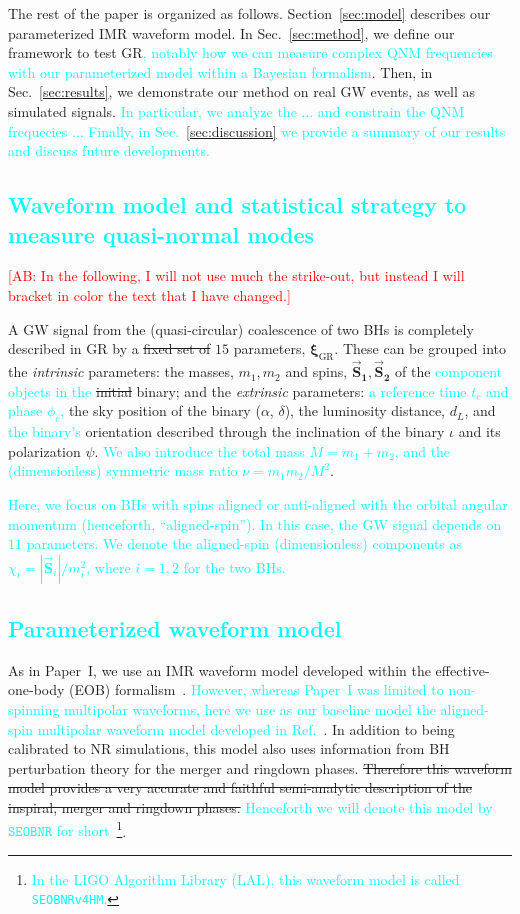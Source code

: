 \documentclass[twocolumn,prd,aps,superscriptaddress,preprintnumbers,tightenlines,showpacs,nofootinbib,eqsecnum,amsfonts,amsmath]{revtex4-1}
\newcommand{\paperone}{Paper~I\xspace}
\newcommand{\ab}[1]{\textcolor{cyan}{#1}}
\newcommand{\comment}[1]{\textcolor{red}{[#1]}}
\newcommand{\bxigr}{\bm{\xi}_{\text{GR}}}
\newcommand{\bs}[1]{\bm{\vec{S}_{#1}}}
\newcommand{\SEOB}{\texttt{SEOBNR}}
\begin{document}
The rest of the paper is organized as follows. Section~\ref{sec:model} describes our parameterized IMR
waveform model. In Sec.~\ref{sec:method}, we define our framework to test GR\ab{, notably how we can measure 
complex QNM frequencies with our parameterized model within a Bayesian formalism}. Then, in Sec.~\ref{sec:results}, 
we demonstrate our method on real GW events, as well as simulated signals. \ab{In particular, we analyze 
the ... and constrain the QNM frequecies ... Finally, in Sec.~\ref{sec:discussion} we provide a summary of
our results and discuss future developments.} 

\ab{\section{Waveform model and statistical strategy to measure quasi-normal modes}}

\comment{AB: In the following, I will not use much the strike-out, but instead I will 
bracket in color the text that I have changed.}

A GW signal from the (quasi-circular) coalescence of two BHs is
completely described in GR by a \sout{fixed set of} $15$ parameters,
$\bxigr$. These can be grouped into the \emph{intrinsic} parameters:
the masses, $m_1, m_2$ and spins, $\bs1, \bs2$ of the \ab{component 
objects in the} \sout{initial} binary; and the 
\emph{extrinsic} parameters: \ab{a reference time $t_c$ and phase 
$\phi_c$,} the sky position of the binary ($\alpha$,
$\delta$), the luminosity distance, $d_L$, and \ab{the binary's} orientation
described through the inclination of the binary $\iota$ and its
polarization $\psi$. \ab{We also introduce the total mass $M = m_1+m_2$, 
and the (dimensionless) symmetric mass ratio $\nu = m_1m_2/M^2$}. 

\ab{Here, we focus on BHs with spins aligned or anti-aligned 
with the orbital angular momentum (henceforth, ``aligned-spin''). In this case,  
the GW signal depends on $11$ parameters. We denote the 
aligned-spin \ab{(dimensionless)} components as $\chi_{i} = |\vec{\bm{S}}_i|/m^2_i$, where $i=1,2$ for the two BHs.}

\ab{\subsection{Parameterized waveform model}}\label{sec:model}

As in \paperone, we use an IMR waveform model developed within the effective-one-body (EOB) 
formalism~\cite{}. \ab{However, whereas \paperone was limited to non-spinning multipolar waveforms, 
here we use as our baseline model the aligned-spin multipolar waveform model 
developed in Ref.~\citep{Cotesta:2018fcv}}. In addition to being
calibrated to NR simulations, this model also uses information from BH
perturbation theory for the merger and ringdown phases. \sout{Therefore this
waveform model provides a very accurate and faithful semi-analytic
description of the inspiral, merger and ringdown phases.} \ab{Henceforth we
will denote this model by $\SEOB$ for short}~\footnote{\ab{In the LIGO Algorithm Library (LAL), this 
waveform model is called {\tt SEOBNRv4HM}.}}.
\end{document}
